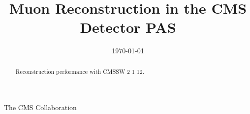 \documentclass[a4paper]{cmspaper}
\newcommand{\pdfbookmark}[3][1]{}
\begin{document}
  \begin{titlepage}
    \date{\today}
    \title{Muon Reconstruction in the CMS Detector PAS}
    \begin{Authlist}
      \vspace{-4mm}
      The CMS Collaboration
    \end{Authlist}
    
    \pdfbookmark[1]{Abstract}{Abstract}
    \vspace{-9mm}
    \begin{abstract}
Reconstruction performance with CMSSW 2 1 12.
\end{abstract} 
  
\end{titlepage}

\setcounter{page}{2}



%
%
%
%
%
%
%
\nocite{*}

\pdfbookmark[1]{References}{References}


\clearpage


\end{document}
